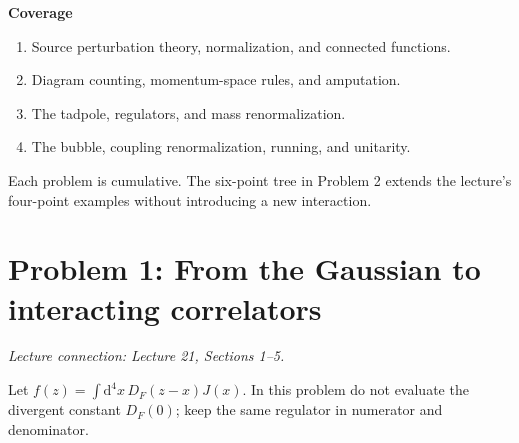 \documentclass[11pt]{article}
\newcommand{\dd}{\mathrm d}
\newcommand{\problem}[2]{\clearpage\section*{\color{qftblue}Problem #1: #2}}
\newcommand{\connection}[1]{{\small\textit{Lecture connection: #1}\par}\medskip}
\begin{document}
\textbf{Coverage}
\begin{enumerate}
\item Source perturbation theory, normalization, and connected functions.
\item Diagram counting, momentum-space rules, and amputation.
\item The tadpole, regulators, and mass renormalization.
\item The bubble, coupling renormalization, running, and unitarity.
\end{enumerate}
Each problem is cumulative. The six-point tree in Problem 2 extends
the lecture's four-point examples without introducing a new interaction.

\problem{1}{From the Gaussian to interacting correlators}
\connection{Lecture 21, Sections 1--5.}
Let \(f(z)=\int\dd^4x\,D_F(z-x)J(x)\). In this problem do not
evaluate the divergent constant \(D_F(0)\); keep the same regulator
in numerator and denominator.
\end{document}
